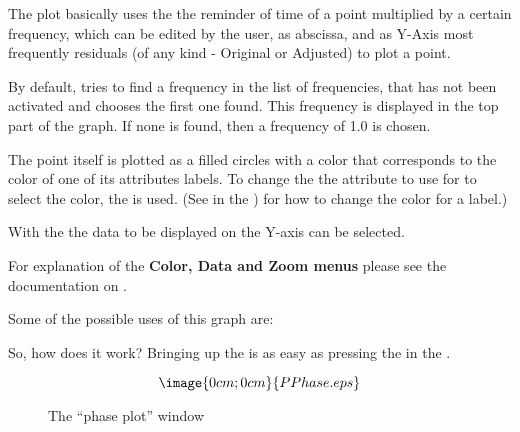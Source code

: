The plot basically uses the the reminder of time of a point multiplied by a
certain frequency, which can be edited by the user, 
as abscissa, and as Y-Axis most frequently residuals
(of any kind - Original or Adjusted) to plot a point.

By default, \period tries to find a frequency in the list of frequencies, 
that has not been activated and chooses the first one found.
This frequency is displayed in the top part of the graph. 
If none is found, then a frequency of 1.0 is chosen.

The point itself is plotted as a filled circles with a color that
corresponds to the color of one of its attributes labels.
To change the the attribute to use for to select the color,
the  is used. 
(See  in the
) for how to
change the color for a label.)

With the  the data to be displayed on the Y-axis can be selected.

For explanation of the {\bf Color, Data and Zoom menus} please see
the documentation on .

Some of the possible uses of this graph are:



So, how does it work? Bringing up the 
is as easy as pressing the  in the
.
\begin{figure}[h]
$$\image{0cm;0cm}{PPhase.eps}$$%
\caption{The ``phase plot'' window}%
\label{period.phase.window}
\end{figure}

